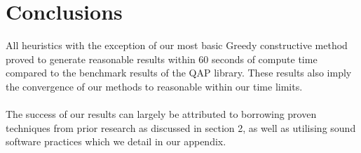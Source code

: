 \documentclass[a4paper,10pt]{article}
\begin{document}
\newpage

\section{Conclusions}

All heuristics with the exception of our most basic Greedy constructive method proved to generate reasonable results within 60 seconds of compute time compared to the benchmark results of the QAP library. These results also imply the convergence of our methods to reasonable within our time limits. \\
\\
The success of our results can largely be attributed to borrowing proven techniques from prior research as discussed in section 2, as well as utilising sound software practices which we detail in our appendix. 
\end{document}
